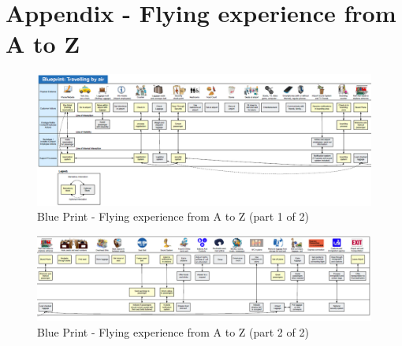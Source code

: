 \chapter{Appendix - Flying experience from A to Z}


\begin{figure}[h!]
	\centering
		\includegraphics[width=1.15\textwidth]{Figures/Appendix1/blueprint1}
		\caption[test meetings data]{Blue Print - Flying experience from A to Z (part 1 of 2)}
		\label{fig:blueprint1}
\end{figure}


\begin{figure}[h!]
	\centering
		\includegraphics[width=1.15\textwidth]{Figures/Appendix1/blueprint2}
	\caption[test meetings data]{Blue Print - Flying experience from A to Z (part 2 of 2)}
	\label{fig:blueprint2}
\end{figure}